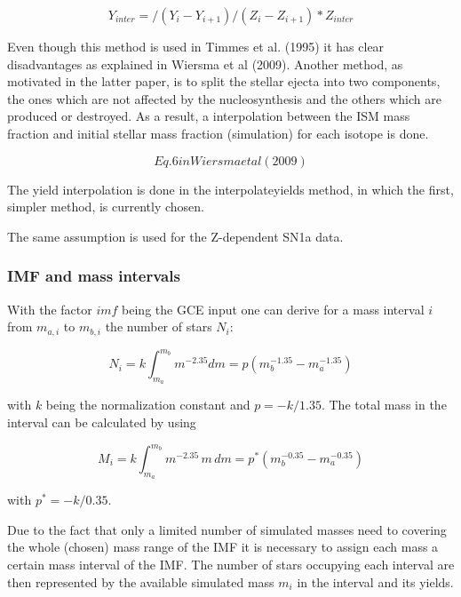 {\begin{equation}
Y_{inter} = /(Y_i-Y_{i+1})/(Z_i-Z_{i+1}) * Z_{inter}
\end{equation}


Even though this method is used in Timmes et al. (1995)
it has clear disadvantages as explained in Wiersma et al (2009).
Another method, as motivated in the latter paper, is to split
the stellar ejecta into two components, the ones which are not
affected by the nucleosynthesis and the others which are 
produced or destroyed. As a result, a interpolation between
the ISM mass fraction and initial stellar mass fraction 
(simulation) for each isotope is done.

\begin{equation}
Eq. 6 in Wiersma et al (2009)
\end{equation}


The yield interpolation is done in the interpolate\textunderscore yields method,
in which the first, simpler method, is currently chosen.


The same assumption is used for the Z-dependent SN1a data.


\subsubsection{IMF and mass intervals}

With the factor $imf$ being the GCE input one can derive for a mass interval $i$
from $m_{a,i}$ to $m_{b,i}$ the number of stars $N_i$:


\begin{equation}
N_i = k \int_{m_a}^{m_b} m^{-2.35} dm = p ( m_b^{-1.35} - m_a^{-1.35} )
\end{equation}

with $k$ being the normalization constant and $p = -k/1.35$.
The total mass in the interval can be calculated by using 

\begin{equation}
M_i = k \int_{m_a}^{m_b} m^{-2.35}\, m\, dm = p^* ( m_b^{-0.35} - m_a^{-0.35} )
\label{eq:imf}
\end{equation}

with $p^* = -k/0.35$.

Due to the fact that only a limited number of simulated masses
need to covering the whole (chosen) mass range of the IMF it is necessary
to assign each mass a certain mass interval of the IMF.
The number of stars occupying each interval are then represented
by the available simulated mass $m_i$ in the interval and its yields.

}
